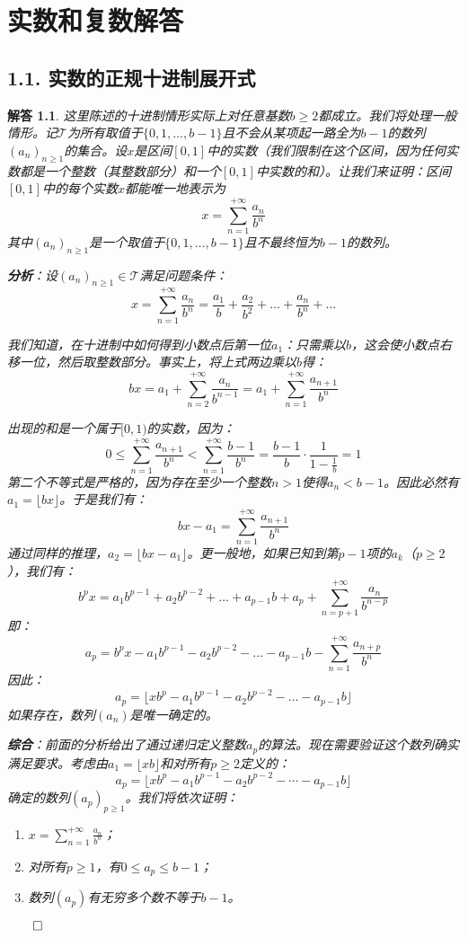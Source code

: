 \documentclass[12pt,UTF8]{ctexbook}
\theoremstyle{exercisestyle}
\theoremstyle{solutionstyle}
\newtheorem*{solution*}{解答}
\newenvironment{solution}
  {\begin{solution*}}
  {\hfill\ensuremath{\qed}\end{solution*}}
\begin{document}
\appendix
\chapter{实数和复数解答}
\section{1.1. 实数的正规十进制展开式}
\begin{solution}
这里陈述的十进制情形实际上对任意基数$b \geq 2$都成立。我们将处理一般情形。记$\mathcal T$为所有取值于$\{0,1,\ldots,b-1\}$且不会从某项起一路全为$b-1$的数列$(a_n)_{n\geq 1}$的集合。设$x$是区间$[0,1]$中的实数（我们限制在这个区间，因为任何实数都是一个整数（其整数部分）和一个$[0,1]$中实数的和）。让我们来证明：区间$[0,1]$中的每个实数$x$都能唯一地表示为
$$x = \sum_{n=1}^{+\infty} \frac{a_n}{b^n}$$
其中$(a_n)_{n \geq 1}$是一个取值于$\{0,1,\ldots,b-1\}$且不最终恒为$b-1$的数列。

\textbf{分析}：设$(a_n)_{n\geqslant 1} \in \mathcal T$满足问题条件：
$$x = \sum_{n=1}^{+\infty} \frac{a_n}{b^n} = \frac{a_1}{b} + \frac{a_2}{b^2} + \dots + \frac{a_n}{b^n} + \dots$$

我们知道，在十进制中如何得到小数点后第一位$a_1$：只需乘以$b$，这会使小数点右移一位，然后取整数部分。事实上，将上式两边乘以$b$得：
$$bx = a_1 + \sum_{n=2}^{+\infty} \frac{a_n}{b^{n-1}} = a_1 + \sum_{n=1}^{+\infty} \frac{a_{n+1}}{b^n}$$

出现的和是一个属于$[0,1)$的实数，因为：
$$0 \leqslant \sum_{n=1}^{+\infty} \frac{a_{n+1}}{b^n} < \sum_{n=1}^{+\infty} \frac{b-1}{b^n} = \frac{b-1}{b} \cdot \frac{1}{1 - \frac{1}{b}} = 1$$
第二个不等式是严格的，因为存在至少一个整数$n > 1$使得$a_n < b - 1$。因此必然有$a_1 = \lfloor bx \rfloor$。于是我们有：
$$bx - a_1 = \sum_{n=1}^{+\infty} \frac{a_{n+1}}{b^n}$$
通过同样的推理，$a_2 = \lfloor bx - a_1 \rfloor$。更一般地，如果已知到第$p-1$项的$a_k$（$p \geqslant 2$），我们有：
$$b^p x = a_1 b^{p-1} + a_2 b^{p-2} + \dots + a_{p-1} b + a_p + \sum_{n=p+1}^{+\infty} \frac{a_n}{b^{n-p}}$$
即：
$$a_p = b^p x - a_1 b^{p-1} - a_2 b^{p-2} - \dots - a_{p-1} b - \sum_{n=1}^{+\infty} \frac{a_{n+p}}{b^n}$$
因此：
$$a_p = \lfloor x b^p - a_1 b^{p-1} - a_2 b^{p-2} - \dots - a_{p-1} b \rfloor$$
如果存在，数列$(a_n)$是唯一确定的。

\textbf{综合}：前面的分析给出了通过递归定义整数$a_p$的算法。现在需要验证这个数列确实满足要求。考虑由$a_1 = \lfloor xb \rfloor$和对所有$p \ge 2$定义的：
$$a_p = \lfloor xb^p - a_1b^{p-1} - a_2b^{p-2} - \cdots - a_{p-1}b \rfloor$$
确定的数列$(a_p)_{p\geq 1}$。我们将依次证明：
\begin{enumerate}
    \item $x = \sum_{n=1}^{+\infty} \frac{a_n}{b^n}$；
    \item 对所有$p \geqslant 1$，有$0 \leqslant a_p \leqslant b - 1$；
    \item 数列$(a_p)$有无穷多个数不等于$b - 1$。
\end{enumerate}


\end{solution}
\end{document}
